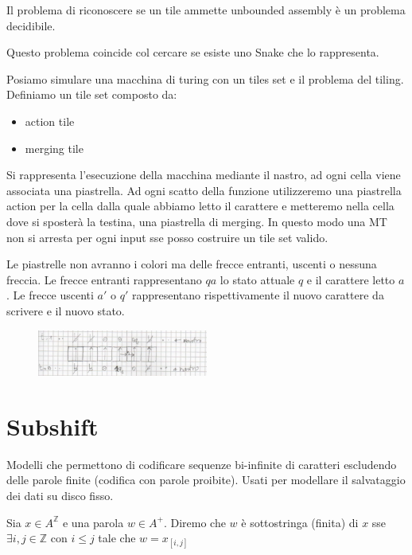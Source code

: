 \begin{teorema}
    Il problema di riconoscere se un tile ammette unbounded assembly è un problema decidibile.

    Questo problema coincide col cercare se esiste uno Snake che lo rappresenta.
\end{teorema}

Posiamo simulare una macchina di turing con un tiles set e il problema del tiling.
Definiamo un tile set composto da:
\begin{itemize}
    \item action tile
    \item merging tile 
\end{itemize}
Si rappresenta l'esecuzione della macchina mediante il nastro, ad ogni cella viene 
associata una piastrella. Ad ogni scatto della funzione utilizzeremo 
una piastrella action per la cella dalla quale abbiamo letto il carattere e metteremo
nella cella dove si sposterà la testina, una piastrella di merging. In questo modo 
una MT non si arresta per ogni input sse posso costruire un tile set valido.

\begin{nota}
    Le piastrelle non avranno i colori ma delle frecce entranti, uscenti o nessuna 
    freccia. Le frecce entranti rappresentano $qa$ lo stato attuale $q$ e il carattere 
    letto $a$. Le frecce uscenti $a'$ o $q'$ rappresentano rispettivamente il nuovo 
    carattere da scrivere e il nuovo stato.
\end{nota}

\begin{figure}[!h]
    \centering
    \includegraphics[width=0.5\textwidth]{img/sistemi_complessi/simulazione_mt_tile.png}
\end{figure}

\section{Subshift}

Modelli che permettono di codificare sequenze bi-infinite di caratteri escludendo 
delle parole finite (codifica con parole proibite). Usati per modellare il salvataggio
dei dati su disco fisso.

\begin{definizione} 
    Sia  $x\in A^\mathbb{Z}$ e una parola $w\in A^+$. Diremo che $w$ è sottostringa (finita) 
    di $x$ sse $\exists i,j\in \mathbb{Z}$ con $i\le j$ tale che $w=x_{[i,j]}$
\end{definizione}

